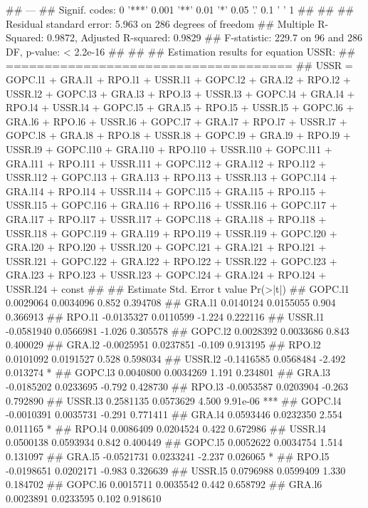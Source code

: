 \documentclass[
]{article}
\begin{document}
\begin{itemize}
## ---
## Signif. codes:  0 '***' 0.001 '**' 0.01 '*' 0.05 '.' 0.1 ' ' 1
## 
## 
## Residual standard error: 5.963 on 286 degrees of freedom
## Multiple R-Squared: 0.9872,  Adjusted R-squared: 0.9829 
## F-statistic: 229.7 on 96 and 286 DF,  p-value: < 2.2e-16 
## 
## 
## Estimation results for equation USSR: 
## ===================================== 
## USSR = GOPC.l1 + GRA.l1 + RPO.l1 + USSR.l1 + GOPC.l2 + GRA.l2 + RPO.l2 + USSR.l2 + GOPC.l3 + GRA.l3 + RPO.l3 + USSR.l3 + GOPC.l4 + GRA.l4 + RPO.l4 + USSR.l4 + GOPC.l5 + GRA.l5 + RPO.l5 + USSR.l5 + GOPC.l6 + GRA.l6 + RPO.l6 + USSR.l6 + GOPC.l7 + GRA.l7 + RPO.l7 + USSR.l7 + GOPC.l8 + GRA.l8 + RPO.l8 + USSR.l8 + GOPC.l9 + GRA.l9 + RPO.l9 + USSR.l9 + GOPC.l10 + GRA.l10 + RPO.l10 + USSR.l10 + GOPC.l11 + GRA.l11 + RPO.l11 + USSR.l11 + GOPC.l12 + GRA.l12 + RPO.l12 + USSR.l12 + GOPC.l13 + GRA.l13 + RPO.l13 + USSR.l13 + GOPC.l14 + GRA.l14 + RPO.l14 + USSR.l14 + GOPC.l15 + GRA.l15 + RPO.l15 + USSR.l15 + GOPC.l16 + GRA.l16 + RPO.l16 + USSR.l16 + GOPC.l17 + GRA.l17 + RPO.l17 + USSR.l17 + GOPC.l18 + GRA.l18 + RPO.l18 + USSR.l18 + GOPC.l19 + GRA.l19 + RPO.l19 + USSR.l19 + GOPC.l20 + GRA.l20 + RPO.l20 + USSR.l20 + GOPC.l21 + GRA.l21 + RPO.l21 + USSR.l21 + GOPC.l22 + GRA.l22 + RPO.l22 + USSR.l22 + GOPC.l23 + GRA.l23 + RPO.l23 + USSR.l23 + GOPC.l24 + GRA.l24 + RPO.l24 + USSR.l24 + const 
## 
##            Estimate Std. Error t value Pr(>|t|)    
## GOPC.l1   0.0029064  0.0034096   0.852 0.394708    
## GRA.l1    0.0140124  0.0155055   0.904 0.366913    
## RPO.l1   -0.0135327  0.0110599  -1.224 0.222116    
## USSR.l1  -0.0581940  0.0566981  -1.026 0.305578    
## GOPC.l2   0.0028392  0.0033686   0.843 0.400029    
## GRA.l2   -0.0025951  0.0237851  -0.109 0.913195    
## RPO.l2    0.0101092  0.0191527   0.528 0.598034    
## USSR.l2  -0.1416585  0.0568484  -2.492 0.013274 *  
## GOPC.l3   0.0040800  0.0034269   1.191 0.234801    
## GRA.l3   -0.0185202  0.0233695  -0.792 0.428730    
## RPO.l3   -0.0053587  0.0203904  -0.263 0.792890    
## USSR.l3   0.2581135  0.0573629   4.500 9.91e-06 ***
## GOPC.l4  -0.0010391  0.0035731  -0.291 0.771411    
## GRA.l4    0.0593446  0.0232350   2.554 0.011165 *  
## RPO.l4    0.0086409  0.0204524   0.422 0.672986    
## USSR.l4   0.0500138  0.0593934   0.842 0.400449    
## GOPC.l5   0.0052622  0.0034754   1.514 0.131097    
## GRA.l5   -0.0521731  0.0233241  -2.237 0.026065 *  
## RPO.l5   -0.0198651  0.0202171  -0.983 0.326639    
## USSR.l5   0.0796988  0.0599409   1.330 0.184702    
## GOPC.l6   0.0015711  0.0035542   0.442 0.658792    
## GRA.l6    0.0023891  0.0233595   0.102 0.918610    

\end{itemize}
\end{document}
